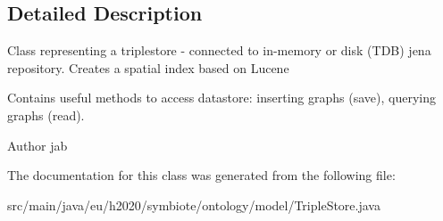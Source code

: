 \subsection{Detailed Description}
Class representing a triplestore -\/ connected to in-\/memory or disk (T\+DB) jena repository. Creates a spatial index based on Lucene

Contains useful methods to access datastore\+: inserting graphs (save), querying graphs (read).

\begin{DoxyAuthor}{Author}
jab 
\end{DoxyAuthor}


The documentation for this class was generated from the following file\+:\begin{DoxyCompactItemize}
\item 
src/main/java/eu/h2020/symbiote/ontology/model/Triple\+Store.\+java\end{DoxyCompactItemize}

